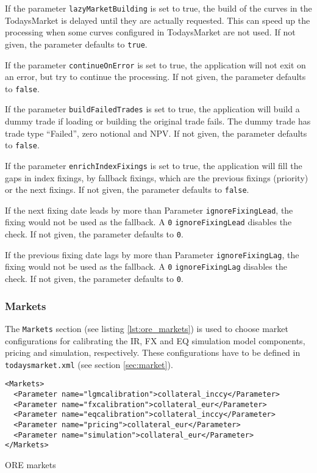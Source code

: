 {\medskip If the parameter {\tt lazyMarketBuilding} is set to true, the build of the curves in the TodaysMarket is
delayed until they are actually requested. This can speed up the processing when some curves configured in TodaysMarket
are not used. If not given, the parameter defaults to {\tt true}.

\medskip If the parameter {\tt continueOnError} is set to true, the application will not exit on an error, but try to
continue the processing. If not given, the parameter defaults to {\tt false}.

\medskip If the parameter {\tt buildFailedTrades} is set to true, the application will build a dummy trade if loading or
building the original trade fails. The dummy trade has trade type ``Failed'', zero notional and NPV.
If not given, the parameter defaults to {\tt false}.

\medskip If the parameter {\tt enrichIndexFixings} is set to true, the application will fill the gaps in index fixings, 
by fallback fixings, which are the previous fixings (priority) or the next fixings.
If not given, the parameter defaults to {\tt false}.

\medskip If the next fixing date leads by more than Parameter {\tt ignoreFixingLead}, the fixing would not be used as the fallback.
A {\tt 0} {\tt ignoreFixingLead} disables the check.
If not given, the parameter defaults to {\tt 0}.

\medskip If the previous fixing date lags by more than Parameter {\tt ignoreFixingLag}, the fixing would not be used as the fallback.
A {\tt 0} {\tt ignoreFixingLag} disables the check.
If not given, the parameter defaults to {\tt 0}.

\subsubsection*{Markets}\label{sec:master_input_markets}

The {\tt Markets} section (see listing \ref{lst:ore_markets}) is used to choose market configurations for calibrating
the IR, FX and EQ simulation model components, pricing and simulation, respectively. These configurations have to be 
defined in {\tt todaysmarket.xml} (see section \ref{sec:market}).

\begin{listing}[H]
\begin{verbatim}
<Markets>
  <Parameter name="lgmcalibration">collateral_inccy</Parameter>
  <Parameter name="fxcalibration">collateral_eur</Parameter>
  <Parameter name="eqcalibration">collateral_inccy</Parameter>
  <Parameter name="pricing">collateral_eur</Parameter>
  <Parameter name="simulation">collateral_eur</Parameter>
</Markets>
\end{verbatim}
\caption{ORE markets}
\label{lst:ore_markets}
\end{listing}

}

